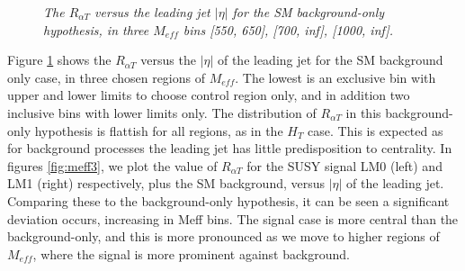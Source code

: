 \begin{figure}[h!]
\caption{\small{\textit{The $R_{\alpha T}$ versus the leading jet $|\eta|$ for the SM background-only hypothesis, in three $M_{eff}$ bins [550, 650], [700, inf], [1000, inf].} }}
\label{fig:meff2}
\end{figure}

Figure \ref{fig:meff2} shows the $R_{\alpha T}$ versus the $|\eta|$ of the leading jet for the SM background only case, in three chosen regions of $M_{eff}$. The lowest is an exclusive bin with upper and lower limits to choose control region only, and in addition two inclusive bins with lower limits only. The distribution of $R_{\alpha T}$ in this background-only hypothesis is flattish for all regions, as in the $H_{T}$ case. This is expected as for background processes the leading jet has little predisposition to centrality. 
In figures \ref{fig:meff3}, we plot the value of $R_{\alpha T}$ for the SUSY signal LM0 (left) and LM1 (right) respectively, plus the SM background, versus $|\eta|$ of the leading jet. Comparing these to the background-only hypothesis, it can be seen a significant deviation occurs, increasing in Meff bins. The signal case is more central than the background-only, and this is more pronounced as we move to higher regions of $M_{eff}$, where the signal is more prominent against background. 

